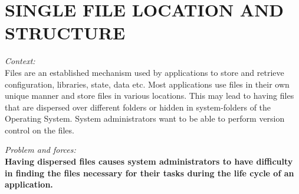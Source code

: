 \newpage
\section*{SINGLE FILE LOCATION AND STRUCTURE}
\textit{Context:}\\
Files are an established mechanism used by applications to store and
retrieve configuration, libraries, state, data etc. Most applications use files in their own unique manner and store files in various locations. This may lead to having files that are dispersed over different folders or hidden in system-folders of the Operating System. System administrators  want to be able to perform version control on the files.
\begin{center}
  
\end{center}

\textit{Problem and forces:\\}
\textbf{Having dispersed files causes system administrators to have difficulty in finding the files necessary for their tasks during the life cycle of an application.}\\

